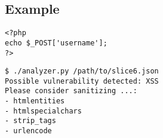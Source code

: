 \subsection*{Example}
\label{sec:experimental.example}

\begin{lstlisting}[label={php.slice06},
    title={slice6.php}]
<?php
echo $_POST['username'];
?>
\end{lstlisting}

\begin{lstlisting}[label={out.example.slice06},
    caption={Example output after running the analyser}]
$ ./analyzer.py /path/to/slice6.json
Possible vulnerability detected: XSS
Please consider sanitizing ...:
- htmlentities
- htmlspecialchars
- strip_tags
- urlencode
\end{lstlisting}
